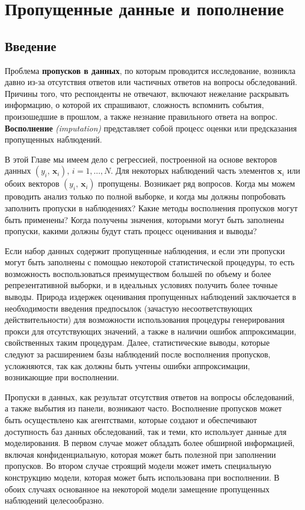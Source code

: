 

\chapter{Пропущенные данные и пополнение}
\section{Введение}
Проблема {\bf пропусков в данных}, по которым проводится исследование, возникла давно из-за отсутствия ответов или частичных ответов на вопросы обследований. Причины того, что респонденты не отвечают, включают нежелание раскрывать информацию, о которой их спрашивают, сложность вспомнить события, произошедшие в прошлом, а также незнание правильного ответа на вопрос. {\bf Восполнение} \emph{(imputation)} представляет собой процесс оценки или предсказания пропущенных наблюдений.

В этой Главе мы имеем дело с регрессией, построенной на основе векторов данных $(y_i, \, \mathbf{x}_i), \, i=1,\dots, N$. Для некоторых наблюдений часть элементов $\mathbf{x}_i$ или обоих векторов $(y_i, \, \mathbf{x}_i)$ пропущены. Возникает ряд вопросов. Когда мы можем проводить анализ только по полной выборке, и когда мы должны попробовать заполнить пропуски в наблюдениях? Какие методы восполнения пропусков могут быть применены? Когда получены значения, которыми могут быть заполнены пропуски, какими должны будут стать процесс оценивания и выводы?

Если набор данных содержит пропущенные наблюдения, и если эти пропуски могут быть заполнены с помощью некоторой статистической процедуры,  то есть возможность воспользоваться преимуществом большей по объему и более репрезентативной выборки, и в идеальных условиях получить более точные выводы. Природа издержек оценивания пропущенных наблюдений заключается в необходимости введения предпосылок (зачастую несоответствующих действительности) для возможности использования процедуры генерирования прокси для отсутствующих значений, а также в наличии ошибок аппроксимации, свойственных таким процедурам. Далее, статистические выводы, которые следуют за расширением базы наблюдений после восполнения пропусков, усложняются, так как должны быть учтены ошибки аппроксимации, возникающие при восполнении. 

Пропуски в данных, как результат отсутствия ответов на вопросы обследований, а также выбытия из панели, возникают часто. Восполнение пропусков может быть осуществлено как агентствами, которые создают и обеспечивают доступность баз данных обследований, так и теми, кто использует данные для моделирования. В первом случае может обладать более обширной информацией, включая конфиденциальную, которая может быть полезной при заполнении пропусков. Во втором случае строящий модели может иметь специальную конструкцию модели, которая может быть использована при восполнении. В обоих случаях основанное на некоторой модели замещение пропущенных наблюдений целесообразно.

